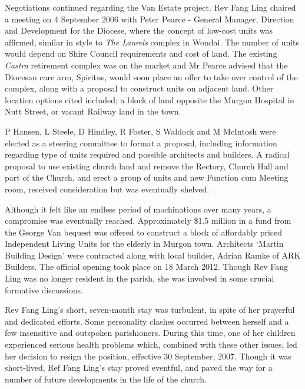 Negotiations continued regarding the Van Estate project. Rev Fang Ling chaired a meeting on 4 September 2006 with Peter Pearce - General Manager, Direction and Development for the Diocese, where the concept of low-cost units was affirmed, similar in style to \emph{The Laurels} complex in Wondai. The number of units would depend on Shire Council requirements and cost of land. The existing \emph{Castra} retirement complex was on the market and Mr Pearce advised that the Diocesan care arm, Spiritus, would soon place an offer to take over control of the complex, along with a proposal to construct units on adjacent land. Other location options cited included; a block of land opposite the Murgon Hospital in Nutt Street, or vacant Railway land in the town.



P Hansen, L Steele, D Hindley, R Foster, S Waldock and M McIntosh were elected as a steering committee to format a proposal, including information regarding type of units required and possible architects and builders. A radical proposal to use existing church land and remove the Rectory, Church Hall and part of the Church, and erect a group of units and new Function cum Meeting room, received consideration but was eventually shelved.



Although it felt like an endless period of machinations over many years, a compromise was eventually reached. Approximately \$1.5 million in a fund from the George Van bequest was offered to construct a block of affordably priced Independent Living Units for the elderly in Murgon town. Architects `Martin Building Design' were contracted along with local builder, Adrian Ramke of ARK Builders. The official opening took place on 18 March 2012. Though Rev Fang Ling was no longer resident in the parish, she was involved in some crucial formative discussions.



Rev Fang Ling's short, seven-month stay was turbulent, in spite of her prayerful and dedicated efforts. Some personality clashes occurred between herself and a few insensitive and outspoken parishioners. During this time, one of her children experienced serious health problems which, combined with these other issues, led her decision to resign the position, effective 30 September, 2007. Though it was short-lived, Ref Fang Ling's stay proved eventful, and paved the way for a number of future developments in the life of the church.



